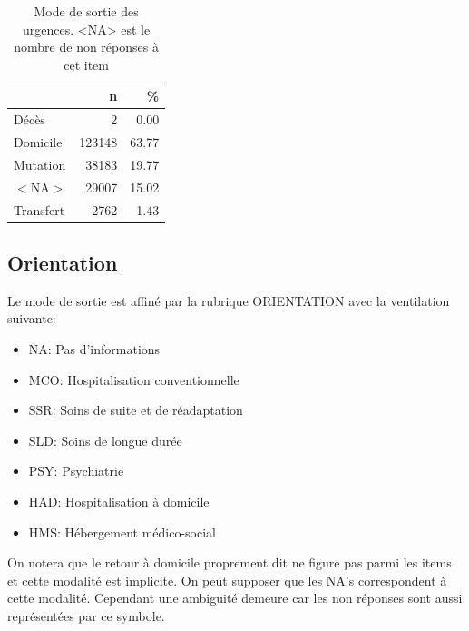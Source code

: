 \documentclass[12pt,english,french,twoside]{report}\usepackage[]{graphicx}\usepackage[]{color}
\begin{document}
\begin{table}[ht]
\centering
\begin{tabular}{|l|r|r|}
  \hline
 & n & \% \\ 
  \hline
Décès & 2 & 0.00 \\ 
  Domicile & 123148 & 63.77 \\ 
  Mutation & 38183 & 19.77 \\ 
  $<$NA$>$ & 29007 & 15.02 \\ 
  Transfert & 2762 & 1.43 \\ 
   \hline
\end{tabular}
\caption{Mode de sortie des urgences. <NA> est le nombre de non réponses à cet item} 
\label{tab.sortie}
\end{table}



\subsection{Orientation}

Le mode de sortie est affiné par la rubrique ORIENTATION avec la ventilation suivante:

\begin{itemize}
  \item NA:    Pas d'informations
  \item MCO:		Hospitalisation conventionnelle
  \item SSR:		Soins de suite et de réadaptation
  \item SLD:		Soins de longue durée
  \item PSY: 		Psychiatrie
  \item HAD:		Hospitalisation à domicile
  \item HMS:		Hébergement médico-social
\end{itemize}

On notera que le retour à domicile proprement dit ne figure pas parmi les items et cette modalité est implicite. On peut supposer que les NA's correspondent à cette modalité. Cependant une ambiguité demeure car les non réponses sont aussi représentées par ce symbole.
\end{document}
